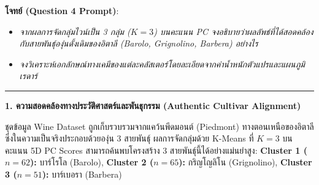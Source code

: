 \documentclass[12pt,a4paper]{article}
\begin{document}
\begin{ansbox}[unbreakable, fontupper={\fontsize{9.1pt}{11.8pt}\selectfont}, left=6pt, right=6pt, top=3pt, bottom=3pt]
\textbf{โจทย์ (Question 4 Prompt)}:
\begin{itemize}[leftmargin=1.2em, itemsep=0pt, topsep=0pt, parsep=0pt]
    \item[(a)] \textit{จากผลการจัดกลุ่มไวน์เป็น 3 กลุ่ม ($K=3$) บนคะแนน PC จงอธิบายว่าผลลัพธ์ที่ได้สอดคล้องกับสายพันธุ์องุ่นดั้งเดิมของอิตาลี (Barolo, Grignolino, Barbera) อย่างไร}
    \item[(b)] \textit{จงวิเคราะห์เอกลักษณ์ทางเคมีของแต่ละคลัสเตอร์โดยละเอียดจากค่าน้ำหนักตัวแปรและแผนภูมิเรดาร์}
\end{itemize}

\vspace{-0.2em}
\noindent\rule{\linewidth}{0.4pt}
\vspace{-0.2em}

\noindent\textbf{\normalsize 1. ความสอดคล้องทางประวัติศาสตร์และพันธุกรรม (Authentic Cultivar Alignment)}\par\vspace{0.04em}
ชุดข้อมูล Wine Dataset ถูกเก็บรวบรวมจากแคว้นพีดมอนต์ (Piedmont) ทางตอนเหนือของอิตาลี ซึ่งในความเป็นจริงประกอบด้วยองุ่น 3 สายพันธุ์ ผลการจัดกลุ่มด้วย K-Means ที่ $K=3$ บนคะแนน 5D PC Scores สามารถค้นพบโครงสร้าง 3 สายพันธุ์นี้ได้อย่างแม่นยำสูง:
\textbf{Cluster 1 ($n=62$):} บาร์โรโล (Barolo), \textbf{Cluster 2 ($n=65$):} กริญโญลิโน (Grignolino), \textbf{Cluster 3 ($n=51$):} บาร์เบอรา (Barbera)


\end{ansbox}
\end{document}
